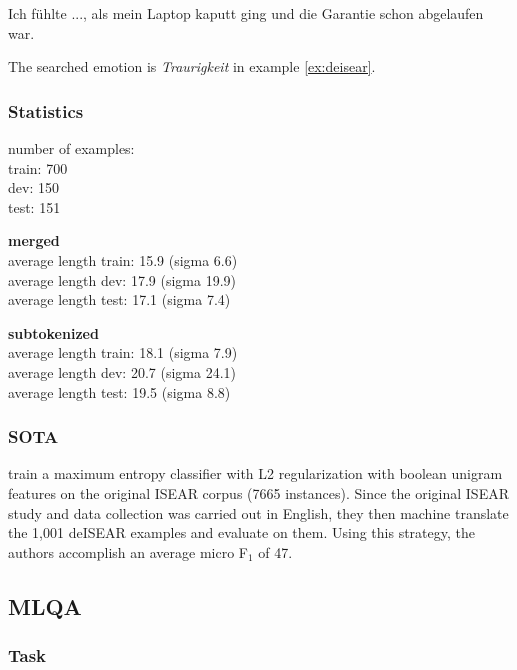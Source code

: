 \begin{examples}
	\label{ex:deisear}
	\item Ich fühlte ..., als mein Laptop kaputt ging und die Garantie schon abgelaufen war.
\end{examples}

The searched emotion is \emph{Traurigkeit} in example \ref{ex:deisear}.


\subsubsection{Statistics}

number of examples: \\
train: 700 \\
dev: 150 \\
test: 151 

\textbf{merged} \\
average length train: 15.9 (sigma 6.6) \\
average length dev: 17.9 (sigma 19.9) \\
average length test: 17.1 (sigma 7.4)

\textbf{subtokenized} \\
average length train: 18.1 (sigma 7.9) \\
average length dev: 20.7 (sigma 24.1) \\
average length test: 19.5 (sigma 8.8)



\subsubsection{SOTA}

\cite{troiano2019crowdsourcing} train a maximum entropy classifier with L2 regularization with boolean unigram features on the original ISEAR corpus (7665 instances). 
Since the original ISEAR study and data collection was carried out in English, they then machine translate the 1,001 deISEAR examples and evaluate on them.
Using this strategy, the authors accomplish an average micro F$_1$ of 47.

\subsection{MLQA}

\subsubsection{Task}

